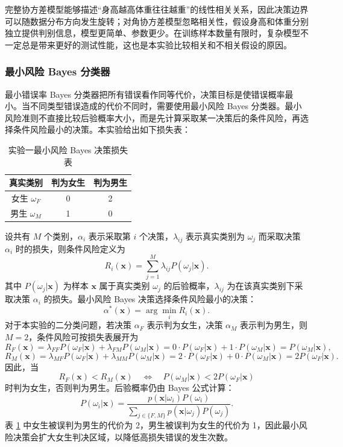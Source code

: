 \documentclass[UTF8,a4paper,12pt]{ctexart}
\begin{document}
完整协方差模型能够描述“身高越高体重往往越重”的线性相关关系，因此决策边界可以随数据分布方向发生旋转；对角协方差模型忽略相关性，假设身高和体重分别独立提供判别信息，模型更简单、参数更少。在训练样本数量有限时，复杂模型不一定总是带来更好的测试性能，这也是本实验比较相关和不相关假设的原因。

\subsubsection{最小风险 Bayes 分类器}

最小错误率 Bayes 分类器把所有错误看作同等代价，决策目标是使错误概率最小。当不同类型错误造成的代价不同时，需要使用最小风险 Bayes 分类器。最小风险准则不直接比较后验概率大小，而是先计算采取某一决策后的条件风险，再选择条件风险最小的决策。本实验给出如下损失表：
\begin{table}[H]
\centering
\caption{实验一最小风险 Bayes 决策损失表}
\label{tab:exp1_loss}
\begin{tabular}{ccc}
\toprule
真实类别 & 判为女生 & 判为男生 \\
\midrule
女生 $\omega_F$ & 0 & 2 \\
男生 $\omega_M$ & 1 & 0 \\
\bottomrule
\end{tabular}
\end{table}
设共有 $M$ 个类别，$\alpha_i$ 表示采取第 $i$ 个决策，$\lambda_{ij}$ 表示真实类别为 $\omega_j$ 而采取决策 $\alpha_i$ 时的损失，则条件风险定义为
\[
R_i(\boldsymbol{x})=\sum_{j=1}^{M}\lambda_{ij}P(\omega_j|\boldsymbol{x}).
\]
其中 $P(\omega_j|\boldsymbol{x})$ 为样本 $\boldsymbol{x}$ 属于真实类别 $\omega_j$ 的后验概率，$\lambda_{ij}$ 为在该真实类别下采取决策 $\alpha_i$ 的损失。最小风险 Bayes 决策选择条件风险最小的决策：
\[
\alpha^\ast(\boldsymbol{x})=\arg\min_i R_i(\boldsymbol{x}).
\]
对于本实验的二分类问题，若决策 $\alpha_F$ 表示判为女生，决策 $\alpha_M$ 表示判为男生，则 $M=2$，条件风险可按损失表展开为
\[
R_F(\boldsymbol{x})
=\lambda_{FF}P(\omega_F|\boldsymbol{x})
+\lambda_{FM}P(\omega_M|\boldsymbol{x})
=0\cdot P(\omega_F|\boldsymbol{x})+1\cdot P(\omega_M|\boldsymbol{x})
=P(\omega_M|\boldsymbol{x}),
\]
\[
R_M(\boldsymbol{x})
=\lambda_{MF}P(\omega_F|\boldsymbol{x})
+\lambda_{MM}P(\omega_M|\boldsymbol{x})
=2\cdot P(\omega_F|\boldsymbol{x})+0\cdot P(\omega_M|\boldsymbol{x})
=2P(\omega_F|\boldsymbol{x}).
\]
因此，当
\[
R_F(\boldsymbol{x})<R_M(\boldsymbol{x})
\quad \Longleftrightarrow \quad
P(\omega_M|\boldsymbol{x})<2P(\omega_F|\boldsymbol{x})
\]
时判为女生，否则判为男生。后验概率仍由 Bayes 公式计算：
\[
P(\omega_i|\boldsymbol{x})
=\frac{p(\boldsymbol{x}|\omega_i)P(\omega_i)}
{\sum_{j\in\{F,M\}}p(\boldsymbol{x}|\omega_j)P(\omega_j)}.
\]
表 \ref{tab:exp1_loss} 中女生被误判为男生的代价为 2，男生被误判为女生的代价为 1，因此最小风险决策会扩大女生判决区域，以降低高损失错误的发生次数。
\end{document}

